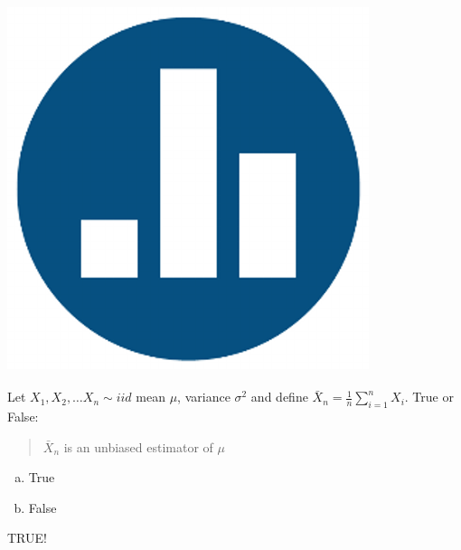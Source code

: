 \begin{frame}
\frametitle{\includegraphics[scale = 0.05]{./images/clicker}}
Let $X_1, X_2, \hdots X_n \sim iid$ mean $\mu$, variance $\sigma^2$ and define $\bar{X}_n = \frac{1}{n}\sum_{i=1}^n X_i$. True or False:

\vspace{1em}
\begin{quotation}
$\bar{X}_n$ is an unbiased estimator of $\mu$
\end{quotation}

\begin{enumerate}[(a)]
\item True
\item False
\end{enumerate}
\pause

\alert{TRUE!}

\end{frame}

